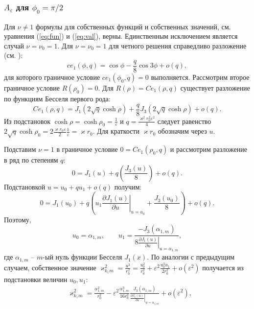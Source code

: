 \subsubsection{$A_\varepsilon$ для $\phi_0=\pi/2$}\label{sec:ch2/sec4/subs3/subs1}


Для $\nu\ne 1$ формулы для собственных функций и собственных значений, см. уравнения (\ref{eq:fun}) и (\ref{eq:val}), верны. Единственным исключением является случай  $\nu=\nu_0=1$.
Для $\nu=\nu_0=1$ для четного решения справедливо разложение (см. \cite[Subsect.~20.2.27]{wref2}):
\begin{equation*}
ce_1(\phi, q) = 	\cos{\phi}  - \frac{q}{8} \cos{3\phi} + o(q),
 \end{equation*}
для которого граничное условие  $ce_1(\phi_0, q)=0$ выполняется. 
Рассмотрим второе граничное условие $R(\rho_0) = 0$.
Для $R(\rho) = Ce_1(\rho, q)$ существует разложение по функциям Бесселя первого рода:
\begin{equation*}
Ce_1(\rho, q) = J_1(2\sqrt{q} \cosh{\rho}) + \frac{q}{8} J_3(2\sqrt{q}\cosh{\rho}) + o(q).
\end{equation*}
Из подстановок $\cosh\rho = \cosh\rho_0 =  \frac{1}{\varepsilon}$ и $q = \frac{\varkappa^2 r_0^2 \varepsilon^2}{4}$ следует равенство
$2\sqrt{q} \cosh{\rho_0} = 2 \frac{\varkappa r_0 \varepsilon}{2} \frac{1}{\varepsilon} = \varkappa r_0$. Для краткости $\varkappa r_0$ обозначим через $u$. 

Подставим $\nu = 1$ в граничное условие $0 = Ce_1(\rho_0, q)$ и рассмотрим разложение в ряд по степеням   $q$:
\begin{equation*}
    0 = J_1(u) + q \left( \frac{J_3(u)}{8} \right) + o(q).
\end{equation*}
Подстановкой  $u = u_0 + q u_1 + o(q)$ получим:
\begin{equation*}
    0 = 
    J_1(u_0) + q \left( 
    u_1 \left.\frac{\partial J_1 (u)}{\partial u}\right|_{u=u_0}
    + \frac{J_3(u_0)}{8}
    \right) + o(q).
\end{equation*}
Поэтому, 
\begin{equation*}
u_0 = \alpha_{1, m}, \qquad u_1 = 
\frac{ - J_3(\alpha_{1, m}) }{8\left.
\frac{\partial J_1 (u)}{\partial u}\right|_{u=\alpha_{1, m}}},
\end{equation*}
где $\alpha_{1, m}$ -- $m$-ый нуль функции Бесселя  $J_1(x)$. По аналогии с предыдущим случаем,
собственное значение $\varkappa_{k, m}^2 = \frac{u^2}{r_0^2} = \frac{u_0^2}{r_0^2} + \varepsilon^2 \frac{u_0^3 u_1}{2r_0^2} + o(\varepsilon^2)$ получается из подстановки величин  $u_0, u_1$:
\begin{align}
   & \varkappa_{k, m}^2 = \frac{\alpha_{1, m}^2}{r_0^2} - \varepsilon^2 \frac{\alpha_{1, m}^3}{16r_0^2} 
    \frac{J_3(\alpha_{1, m})}{\left.\frac{\partial J_1 (u)}{\partial u}\right|_{u=\alpha_{1, m}}} 
    + o(\varepsilon^2), \label{eq:valS1}
    \end{align}



